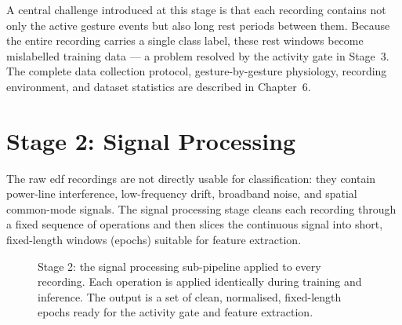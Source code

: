 A central challenge introduced at this stage is that each recording
contains not only the active gesture events but also long rest
periods between them. Because the entire recording carries a single
class label, these rest windows become mislabelled training data ---
a problem resolved by the activity gate in Stage~3. The complete
data collection protocol, gesture-by-gesture physiology, recording
environment, and dataset statistics are described in
Chapter~6.

\section{Stage 2: Signal Processing}
\label{sec:mo_preprocessing}

The raw \acrshort{edf} recordings are not directly usable for
classification: they contain power-line interference, low-frequency
drift, broadband noise, and spatial common-mode signals. The signal
processing stage cleans each recording through a fixed sequence of
operations and then slices the continuous signal into short,
fixed-length windows (epochs) suitable for feature extraction.

\begin{figure}[htbp]
\centering
{}
\caption{Stage 2: the signal processing sub-pipeline applied to
every recording. Each operation is applied identically during
training and inference. The output is a set of clean, normalised,
fixed-length epochs ready for the activity gate and feature
extraction.}
\label{fig:mo_preprocessing}
\end{figure}

